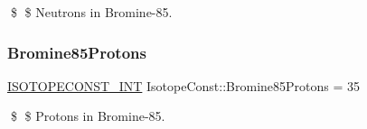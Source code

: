 \$ \$ Neutrons in Bromine-\/85. \mbox{\label{group___isotope_const-_bromine-_br85_ga0c1d316204e2f77f8a5618fc6dca69e7}} 
\subsubsection{\texorpdfstring{Bromine85\+Protons}{Bromine85Protons}}
{\footnotesize\ttfamily \mbox{\hyperlink{group___isotope_const-_macros_ga5f18360b3e99483a35c32d789e62621c}{I\+S\+O\+T\+O\+P\+E\+C\+O\+N\+S\+T\+\_\+\+I\+NT}} Isotope\+Const\+::\+Bromine85\+Protons = 35}

\$ \$ Protons in Bromine-\/85. 
